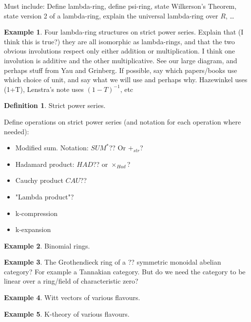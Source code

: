 \documentclass[a4paper]{article}
\theoremstyle{definition}
\newtheorem{definition}{Definition}[section]
\newtheorem{example}{Example}[section]
\theoremstyle{remark}
\begin{document}
Must include: Define lambda-ring, define psi-ring, state Wilkerson's Theorem, state version 2 of a lambda-ring, explain the universal lambda-ring over $R$, \ldots

\begin{example}
Four lambda-ring structures on strict power series. Explain that (I think this is true?) they are all isomorphic as lambda-rings, and that the two obvious involutions respect only either addition or multiplication. I think one involution is additive and the other multiplicative. See our large diagram, and perhaps stuff from Yau and Grinberg. If possible, say which papers/books use which choice of unit, and say what we will use and perhaps why. Hazewinkel uses (1+T), Lenstra's note uses $(1-T)^{-1}$, etc
\end{example}




\begin{definition}
\item Strict power series.
\end{definition}

Define operations on strict power series (and notation for each operation where needed):
\begin{itemize}
\item Modified sum. Notation: $SUM^{*}$?? Or $+_{str}$?
\item Hadamard product: $HAD$?? or $\times_{Had}$?
\item Cauchy product $CAU$?? 
\item "Lambda product"?
\item k-compression
\item k-expansion
\end{itemize}



\begin{example}
Binomial rings.
\end{example}

\begin{example}
The Grothendieck ring of a ?? symmetric monoidal abelian category? For example a Tannakian category. But do we need the category to be linear over a ring/field of characteristic zero?
\end{example}

\begin{example}
Witt vectors of various flavours.
\end{example}

\begin{example}
K-theory of various flavours.
\end{example}
\end{document}
